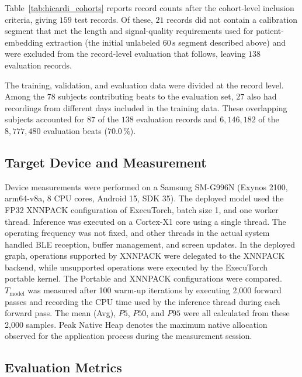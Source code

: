 Table~\ref{tab:hicardi_cohorts} reports record counts after the cohort-level
inclusion criteria, giving $159$ test records. Of these, $21$ records did not
contain a calibration segment that met the length and signal-quality
requirements used for patient-embedding extraction (the initial unlabeled
$60\,\mathrm{s}$ segment described above) and were excluded from the
record-level evaluation that follows, leaving $138$ evaluation records.

The training, validation, and evaluation data were divided at the record level.
Among the $78$ subjects contributing beats to the evaluation set, $27$ also had
recordings from different days included in the training data.
These overlapping subjects accounted for $87$ of the $138$ evaluation records
and $6{,}146{,}182$ of the $8{,}777{,}480$ evaluation beats
($70.0\,\%$).

\subsection{Target Device and Measurement} 
\label{sec:exp_devices}

Device measurements were performed on a Samsung SM-G996N (Exynos 2100, arm64-v8a, 8 CPU cores, Android 15, SDK 35).
The deployed model used the FP32 XNNPACK configuration of ExecuTorch, batch size 1, and one worker thread.
Inference was executed on a Cortex-X1 core using a single thread.
The operating frequency was not fixed, and other threads in the actual system handled BLE reception, buffer management, and screen updates.
In the deployed graph, operations supported by XNNPACK were delegated to the XNNPACK backend, while unsupported operations were executed by the ExecuTorch portable kernel.
The Portable and XNNPACK configurations were compared.
$T_{\mathrm{model}}$ was measured after 100 warm-up iterations by executing 2,000 forward passes and recording the CPU time used by the inference thread during each forward pass.
The mean (Avg), $P5$, $P50$, and $P95$ were all calculated from these 2,000 samples.
Peak Native Heap denotes the maximum native allocation observed for the application process during the measurement session.

\subsection{Evaluation Metrics}
\label{sec:timing_metrics}

